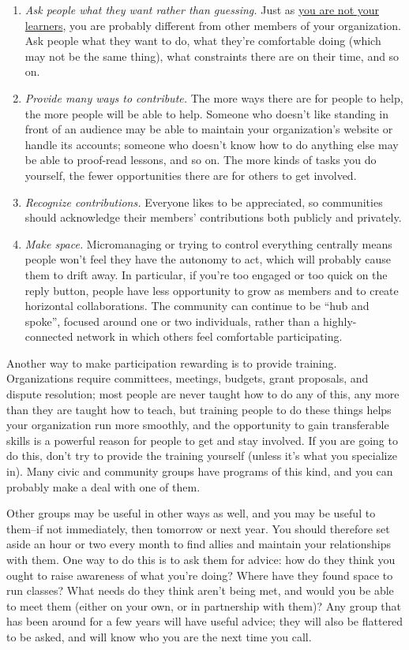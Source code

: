 \documentclass[10pt,statementpaper]{memoir}
\begin{document}
\begin{enumerate}
\def\labelenumi{\arabic{enumi}.}
\item
  \emph{Ask people what they want rather than guessing.} Just as
  \href{lesson.html\#a-reminder}{you are not your learners}, you are
  probably different from other members of your organization. Ask people
  what they want to do, what they're comfortable doing (which may not be
  the same thing), what constraints there are on their time, and so on.
\item
  \emph{Provide many ways to contribute.} The more ways there are for
  people to help, the more people will be able to help. Someone who
  doesn't like standing in front of an audience may be able to maintain
  your organization's website or handle its accounts; someone who
  doesn't know how to do anything else may be able to proof-read
  lessons, and so on. The more kinds of tasks you do yourself, the fewer
  opportunities there are for others to get involved.
\item
  \emph{Recognize contributions.} Everyone likes to be appreciated, so
  communities should acknowledge their members' contributions both
  publicly and privately.
\item
  \emph{Make space.} Micromanaging or trying to control everything
  centrally means people won't feel they have the autonomy to act, which
  will probably cause them to drift away. In particular, if you're too
  engaged or too quick on the reply button, people have less opportunity
  to grow as members and to create horizontal collaborations. The
  community can continue to be ``hub and spoke'', focused around one or
  two individuals, rather than a highly-connected network in which
  others feel comfortable participating.
\end{enumerate}

Another way to make participation rewarding is to provide training.
Organizations require committees, meetings, budgets, grant proposals,
and dispute resolution; most people are never taught how to do any of
this, any more than they are taught how to teach, but training people to
do these things helps your organization run more smoothly, and the
opportunity to gain transferable skills is a powerful reason for people
to get and stay involved. If you are going to do this, don't try to
provide the training yourself (unless it's what you specialize in). Many
civic and community groups have programs of this kind, and you can
probably make a deal with one of them.

Other groups may be useful in other ways as well, and you may be useful
to them--if not immediately, then tomorrow or next year. You should
therefore set aside an hour or two every month to find allies and
maintain your relationships with them. One way to do this is to ask them
for advice: how do they think you ought to raise awareness of what
you're doing? Where have they found space to run classes? What needs do
they think aren't being met, and would you be able to meet them (either
on your own, or in partnership with them)? Any group that has been
around for a few years will have useful advice; they will also be
flattered to be asked, and will know who you are the next time you call.
\end{document}
